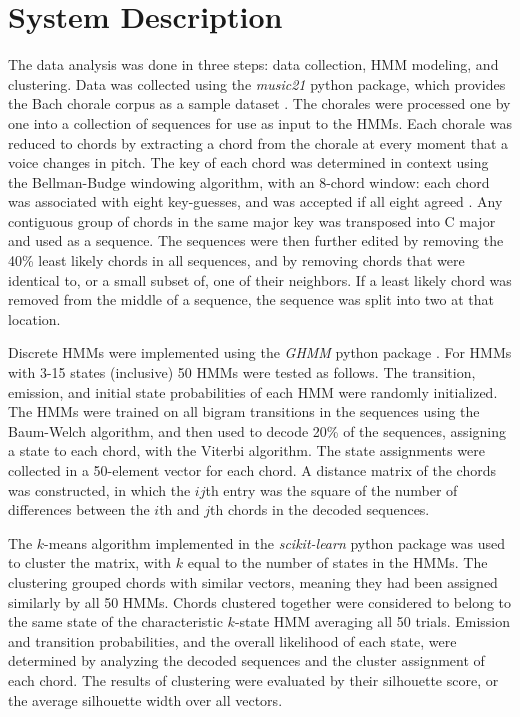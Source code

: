 \documentclass[letterpaper]{article}
\begin{document}
\section{System Description}
The data analysis was done in three steps: data collection, HMM modeling, and clustering. Data was collected using the \emph{music21} python package, which provides the Bach chorale corpus as a sample dataset \cite{cuthbert2010music21}. The chorales were processed one by one into a collection of sequences for use as input to the HMMs. Each chorale was reduced to chords by extracting a chord from the chorale at every moment that a voice changes in pitch. The key of each chord was determined in context using the Bellman-Budge windowing algorithm, with an 8-chord window: each chord was associated with eight key-guesses, and was accepted if all eight agreed \cite{cuthbert2010music21}. Any contiguous group of chords in the same major key was transposed into C major and used as a sequence. The sequences were then further edited by removing the 40\% least likely chords in all sequences, and by removing chords that were identical to, or a small subset of, one of their neighbors. If a least likely chord was removed from the middle of a sequence, the sequence was split into two at that location.

Discrete HMMs were implemented using the \emph{GHMM} python package \cite{ghmm}. For HMMs with 3-15 states (inclusive) 50 HMMs were tested as follows. The transition, emission, and initial state probabilities of each HMM were randomly initialized. The HMMs were trained on all bigram transitions in the sequences using the Baum-Welch algorithm, and then used to decode 20\% of the sequences, assigning a state to each chord, with the Viterbi algorithm. The state assignments were collected in a 50-element vector for each chord. A distance matrix of the chords was constructed, in which the $ij$th entry was the square of the number of differences between the $i$th and $j$th chords in the decoded sequences.

The $k$-means algorithm implemented in the \emph{scikit-learn} python package \cite{pedregosa2011scikit} was used to cluster the matrix, with $k$ equal to the number of states in the HMMs. The clustering grouped chords with similar vectors, meaning they had been assigned similarly by all 50 HMMs. Chords clustered together were considered to belong to the same state of the characteristic $k$-state HMM averaging all 50 trials.
Emission and transition probabilities, and the overall likelihood of each state, were determined by analyzing the decoded sequences and the cluster assignment of each chord. The results of clustering were evaluated by their silhouette score, or the average silhouette width over all vectors.
\end{document}
